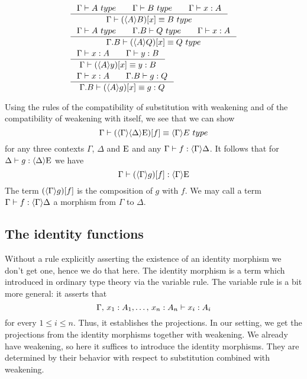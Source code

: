 \begin{align}
& \inference{\jtype{\Gamma}{A}\qquad\jtype{\Gamma}{B}\qquad\jterm{\Gamma}{A}{x}}{\jtypeeq{\Gamma}{\subst{x}{\ctxwk{A}{B}}}{B}}\\
& \inference{\jtype{\Gamma}{A}\qquad\jtype{\ctxext{\Gamma}{B}}{Q}\qquad\jterm{\Gamma}{A}{x}}{\jtypeeq{\ctxext{\Gamma}{B}}{\subst{x}{\ctxwk{A}{Q}}}{Q}}\\
& \inference{\jterm{\Gamma}{A}{x}\qquad\jterm{\Gamma}{B}{y}}{\jtermeq{\Gamma}{B}{\subst{x}{\ctxwk{A}{y}}}{y}}\\
& \inference{\jterm{\Gamma}{A}{x}\qquad\jterm{\ctxext{\Gamma}{B}}{Q}{g}}{\jtermeq{\ctxext{\Gamma}{B}}{Q}{\subst{x}{\ctxwk{A}{g}}}{g}}
\end{align}

Using the rules of the compatibility of substitution with weakening and of the
compatibility of weakening with itself, we see that we can show
\begin{equation*}
\jtypeeq{\Gamma}{\subst{f}{\ctxwk{\Gamma}{{\Delta}{\greek{E}}}}}{\ctxwk{\Gamma}{E}}
\end{equation*}
for any three contexts $\Gamma$, $\Delta$ and $\mathrm{E}$ and any $\jhom{\Gamma}{\Delta}{f}$.
It follows that for $\jhom{\Delta}{\greek{E}}{g}$ we have
\begin{equation*}
\jhom{\Gamma}{\greek{E}}{\subst{f}{\ctxwk{\Gamma}{g}}}
\end{equation*}
The term $\jcomp{\Gamma}{f}{g}$ is the composition of $g$ with $f$. We may call
a term $\jhom{\Gamma}{\Delta}{f}$ a morphism from $\Gamma$ to $\Delta$.

\subsection{The identity functions}
Without a rule explicitly asserting the existence of an identity morphism we don't
get one, hence we do that here. The identity morphism is a term which introduced
in ordinary type theory via the variable rule. The variable rule is a bit more
general: it asserts that
\begin{equation*}
\jterm{\Gamma,\,x_1:A_1,\ldots,\,x_n:A_n}{A_i}{x_i}
\end{equation*}
for every $1\leq i\leq n$. Thus, it establishes the projections. In our setting,
we get the projections from the identity morphisms together with weakening. We
already have weakening, so here it suffices to introduce the identity morphisms.
They are determined by their behavior with respect to substitution combined with
weakening.

